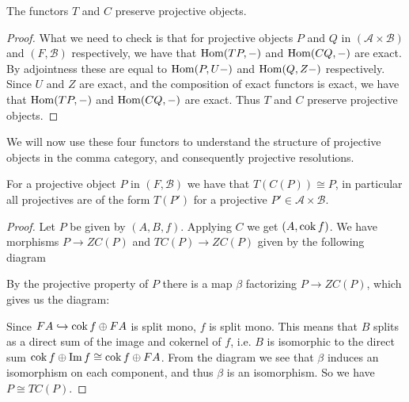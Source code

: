 \begin{cor}
	The functors $T$ and $C$ preserve projective objects.
	\begin{proof}
		What we need to check is that for projective objects $P$ and $Q$ in $(\mathcal A \times \mathcal B)$ and $(F, \mathcal B)$ respectively, we have that $\operatorname{Hom}(TP, -)$ and $\operatorname{Hom}(CQ, -)$ are exact. By adjointness these are equal to $\operatorname{Hom}(P, U-)$ and $\operatorname{Hom}(Q, Z-)$ respectively. Since $U$ and $Z$ are exact, and the composition of exact functors is exact, we have that $\operatorname{Hom}(TP, -)$ and $\operatorname{Hom}(CQ, -)$ are exact. Thus $T$ and $C$ preserve projective objects.
	\end{proof}
\end{cor}

We will now use these four functors to understand the structure of projective objects in the comma category, and consequently projective resolutions.

\begin{prop}\cite[Corollary~1.6c]{FGR75}
	For a projective object $P$ in $(F, \mathcal B)$ we have that $T(C(P)) \cong P$, in particular all projectives are of the form $T(P')$ for a projective $P' \in \mathcal A \times \mathcal B$.
	\begin{proof}
		Let $P$ be given by $(A,B,f)$. Applying $C$ we get $(A, \operatorname{cok} f)$. We have morphisms $P \to ZC(P)$ and $TC(P) \to ZC(P)$ given by the following diagram
		\begin{center}
		\end{center}
		By the projective property of $P$ there is a map $\beta$ factorizing $P \to ZC(P)$, which gives us the diagram:
		\begin{center}
		\end{center}
		Since $FA \hookrightarrow \operatorname{cok} f \oplus FA$ is split mono, $f$ is split mono. This means that $B$ splits as a direct sum of the image and cokernel of $f$, i.e. $B$ is isomorphic to the direct sum $\operatorname{cok} f \oplus \operatorname{Im} f \cong \operatorname{cok} f \oplus FA$. From the diagram we see that $\beta$ induces an isomorphism on each component, and thus $\beta$ is an isomorphism. So we have $P \cong TC(P)$.
	\end{proof}
\end{prop}

